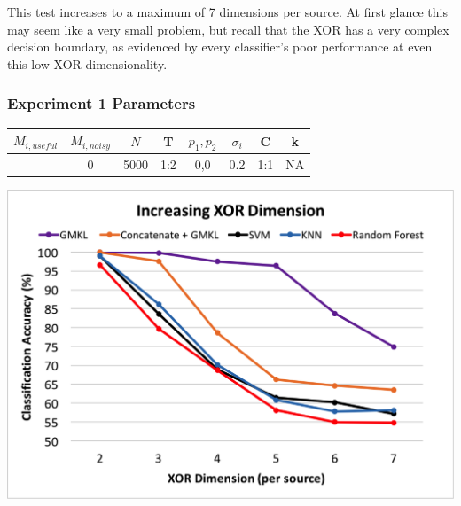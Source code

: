 \documentclass{article}
\begin{document}
This test increases to a maximum of 7 dimensions per source. At first glance
this may seem like a very small problem, but recall that the XOR has a very
complex decision boundary, as evidenced by every classifier's poor performance
at even this low XOR dimensionality.

\begin{minipage}{\textwidth}
\centering
\subsubsection*{Experiment 1 Parameters}
\begin{tabular}{|c|c|c|c|c|c|c|c|}
\hline
$M_{i,useful}$ & $M_{i, noisy}$ & $N$ & T &  $p_1, p_2$ & $\sigma_i$ & C &  k  \\
\hline
[2,3,4,5,6,7] & 0 & 5000 & 1:2 & 0,0 & 0.2 & 1:1 & NA  \\
\hline
\end{tabular}
\label{tab:exp_1_params}
\end{minipage}



\begin{minipage}{\textwidth}
\centering
\includegraphics[scale=0.4]{experimentpic1.png}
\label{fig:exp_1}
\end{minipage}
\end{document}

